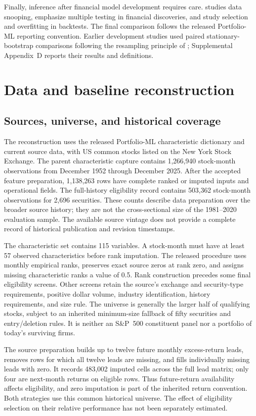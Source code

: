 \documentclass[12pt,letterpaper,fleqn]{article}
\begin{document}
Finally, inference after financial model development requires care. \citet{white2000} studies data snooping, \citet{harvey2016} emphasize multiple testing in financial discoveries, and \citet{bailey2017} study selection and overfitting in backtests. The final comparison follows the released Portfolio-ML reporting convention. Earlier development studies used paired stationary-bootstrap comparisons following the resampling principle of \citet{politis1994}; Supplemental Appendix~D reports their results and definitions.

\section{Data and baseline reconstruction}\label{sec:data}
\subsection{Sources, universe, and historical coverage}
The reconstruction uses the released Portfolio-ML characteristic dictionary and current source data, with US common stocks listed on the New York Stock Exchange. The parent characteristic capture contains 1,266,940 stock-month observations from December 1952 through December 2025. After the accepted feature preparation, 1,138,263 rows have complete ranked or imputed inputs and operational fields. The full-history eligibility record contains 503,362 stock-month observations for 2,696 securities. These counts describe data preparation over the broader source history; they are not the cross-sectional size of the 1981--2020 evaluation sample. The available source vintage does not provide a complete record of historical publication and revision timestamps.

The characteristic set contains 115 variables. A stock-month must have at least 57 observed characteristics before rank imputation. The released procedure uses monthly empirical ranks, preserves exact source zeros at rank zero, and assigns missing characteristic ranks a value of 0.5. Rank construction precedes some final eligibility screens. Other screens retain the source's exchange and security-type requirements, positive dollar volume, industry identification, history requirements, and size rule. The universe is generally the larger half of qualifying stocks, subject to an inherited minimum-size fallback of fifty securities and entry/deletion rules. It is neither an S\&P~500 constituent panel nor a portfolio of today's surviving firms.

The source preparation builds up to twelve future monthly excess-return leads, removes rows for which all twelve leads are missing, and fills individually missing leads with zero. It records 483,002 imputed cells across the full lead matrix; only four are next-month returns on eligible rows. Thus future-return availability affects eligibility, and zero imputation is part of the inherited return convention. Both strategies use this common historical universe. The effect of eligibility selection on their relative performance has not been separately estimated.
\end{document}
